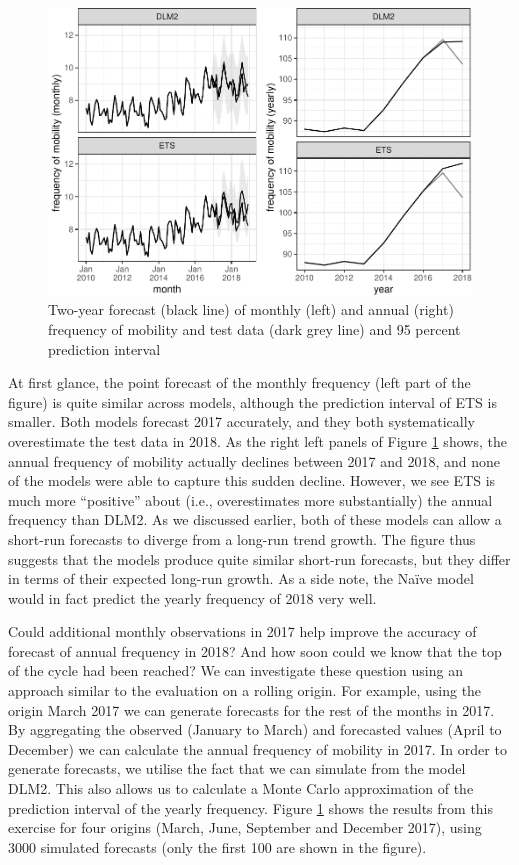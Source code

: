 \documentclass[12pt, a4paper]{article}
\begin{document}
\begin{figure}[H]
  \caption{\label{fig:forecast-2017}Two-year forecast (black line) of monthly
(left) and annual (right) frequency of mobility and test data (dark grey
line) and 95 percent prediction interval}
\centering
\includegraphics[scale = 0.8]{../figs/freq--forecast-2017-1.pdf}
\end{figure}

At first glance, the point forecast of the monthly frequency (left part
of the figure) is quite similar across models, although the prediction
interval of ETS is smaller. Both models forecast 2017 accurately, and
they both systematically overestimate the test data in 2018. As the
right left panels of Figure \ref{fig:forecast-2017} shows, the annual
frequency of mobility actually declines between 2017 and 2018, and none
of the models were able to capture this sudden decline. However, we see
ETS is much more ``positive'' about (i.e., overestimates more
substantially) the annual frequency than DLM2. As we discussed earlier,
both of these models can allow a short-run forecasts to diverge from a
long-run trend growth. The figure thus suggests that the models produce
quite similar short-run forecasts, but they differ in terms of their
expected long-run growth. As a side note, the Naïve model would in fact
predict the yearly frequency of 2018 very well.

Could additional monthly observations in 2017 help improve the accuracy of forecast of annual frequency in 2018? And how soon could we know that the top of the cycle had been reached? We can investigate these question using an approach similar to the evaluation on a rolling origin. For example, using the origin March 2017 we can generate forecasts for the rest of the months in 2017. By aggregating the observed (January to March) and forecasted values (April to December) we can calculate the annual frequency of mobility in 2017. In order to generate forecasts, we utilise the fact that we can simulate from the model DLM2. This also allows us to calculate a Monte Carlo approximation of the prediction interval of the yearly frequency. Figure \ref{fig:forecast-2017} shows the results from this exercise for four origins (March, June, September and December 2017), using 3000 simulated forecasts (only the first 100 are shown in the figure).
\end{document}
